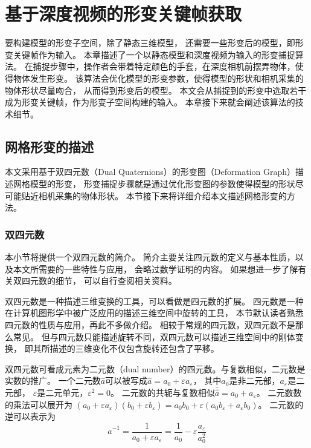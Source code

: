 \chapter{基于深度视频的形变关键帧获取}
要构建模型的形变子空间，除了静态三维模型，
还需要一些形变后的模型，即形变关键帧作为输入。
本章描述了一个以静态模型和深度视频为输入的形变捕捉算法。
在捕捉步骤中，操作者会带着特定颜色的手套，在深度相机前摆弄物体，使得物体发生形变。
该算法会优化模型的形变参数，使得模型的形状和相机采集的物体形状尽量吻合，
从而得到形变后的模型。
本文会从捕捉到的形变中选取若干成为形变关键帧，作为形变子空间构建的输入。
本章接下来就会阐述该算法的技术细节。
\section{网格形变的描述}
本文采用基于双四元数（Dual Quaternions）的形变图（Deformation Graph）描述网格模型的形变，
形变捕捉步骤就是通过优化形变图的参数使得模型的形状尽可能贴近相机采集的物体形状。
本节接下来将详细介绍本文描述网格形变的方法。
\subsection{双四元数}
本小节将提供一个双四元数的简介。
简介主要关注四元数的定义与基本性质，以及本文所需要的一些特性与应用，
会略过数学证明的内容。
如果想进一步了解有关双四元数的细节，
可以自行查阅相关资料\cite{mccarthy1990introduction}\cite{kavan2006dual}。

双四元数是一种描述三维变换的工具，可以看做是四元数的扩展。
四元数是一种在计算机图形学中被广泛应用的描述三维空间中旋转的工具，
本节默认读者熟悉四元数的性质与应用，再此不多做介绍。
相较于常规的四元数，双四元数不是那么常见。
但与四元数只能描述旋转不同，双四元数可以描述三维空间中的刚体变换，
即其所描述的三维变化不仅包含旋转还包含了平移。

双四元数可看成元素为二元数（dual number）的四元数。与复数相似，二元数是实数的推广。
一个二元数$\hat{a}$可以被写成$\hat{a} = a_0 + \varepsilon a_{\varepsilon}$，
其中$a_0$是非二元部，$a_{\varepsilon}$是二元部，
$\varepsilon$是二元单元，${\varepsilon}^2=0$。
二元数的共轭与复数相似$\bar{\hat{a}} = a_0 + a_{\varepsilon}$。
二元数数的乘法可以展开为
$(a_0+\varepsilon a_{\varepsilon})(b_0 + \varepsilon b_{\varepsilon})=
 a_0b_0 + \varepsilon (a_0b_{\varepsilon} + a_{\varepsilon}b_0)$。
二元数的逆可以表示为
\begin{equation}
    \hat{a}^{-1}=\frac{1}{a_0+\varepsilon a_{\varepsilon}}
    =\frac{1}{a_0}-\varepsilon \frac{a_{\varepsilon}}{a^2_0}
\end{equation}

